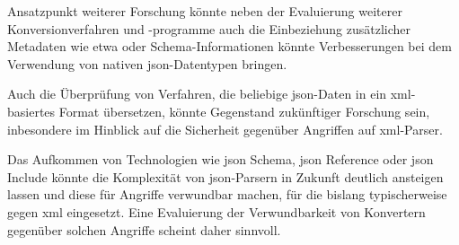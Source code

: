 Ansatzpunkt weiterer Forschung könnte neben der Evaluierung weiterer Konversionverfahren und -programme auch die Einbeziehung zusätzlicher Metadaten wie etwa  oder Schema-Informationen könnte Verbesserungen bei dem Verwendung von nativen \acrshort{json}-Datentypen bringen.

Auch die Überprüfung von Verfahren, die beliebige \acrshort{json}-Daten in ein \acrshort{xml}-basiertes Format übersetzen, könnte Gegenstand zukünftiger Forschung sein, inbesondere im Hinblick auf die Sicherheit gegenüber Angriffen auf \acrshort{xml}-Parser.

Das Aufkommen von Technologien wie \acrshort{json} Schema, \acrshort{json} Reference oder \acrshort{json} Include könnte die Komplexität von \acrshort{json}-Parsern in Zukunft deutlich ansteigen lassen und diese für Angriffe verwundbar machen, für die bislang typischerweise gegen \acrshort{xml} eingesetzt. Eine Evaluierung der Verwundbarkeit von Konvertern gegenüber solchen Angriffe scheint daher sinnvoll.

